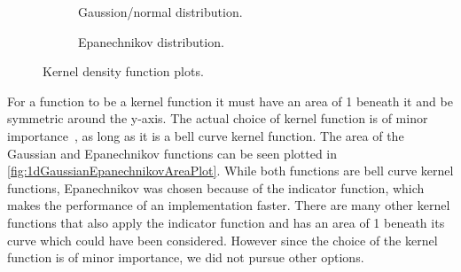 \begin{figure}[htbp]
\begin{subfigure}[c]{.49\linewidth}
    \centering
    \caption{Gaussion/normal distribution.}
    \label{fig:1dGaussianDistributionPlot}
\end{subfigure}
%
\begin{subfigure}[c]{.49\linewidth}
    \centering
    \caption{Epanechnikov distribution.}
    \label{fig:1dEpanechnikovDistributionPlot}
\end{subfigure}
\caption{Kernel density function plots.}
\end{figure}

For a function to be a kernel function it must have an area of 1 beneath it and be symmetric around the y-axis. The actual choice of kernel function is of minor importance~\cite{masteropgave}, as long as it is a bell curve kernel function. The area of the Gaussian and Epanechnikov functions can be seen plotted in \cref{fig:1dGaussianEpanechnikovAreaPlot}. While both functions are bell curve kernel functions, Epanechnikov was chosen because of the indicator function, which makes the performance of an implementation faster. There are many other kernel functions that also apply the indicator function and has an area of 1 beneath its curve which could have been considered. However since the choice of the kernel function is of minor importance, we did not pursue other options.

